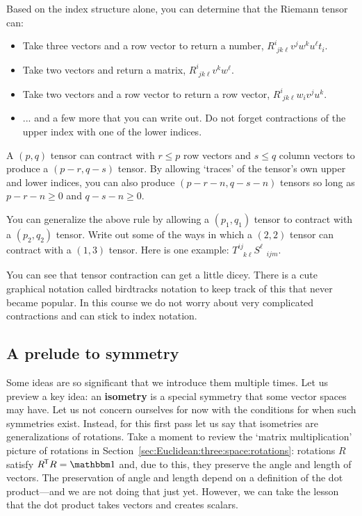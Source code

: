 Based on the index structure alone, you can determine that the Riemann tensor can:
\begin{itemize}
    \item Take three vectors and a row vector to return a number, $R^i_{\phantom{i}jk\ell} v^jw^ku^\ell t_i$.
    \item Take two vectors and return a matrix, $R^i_{\phantom{i}jk\ell}v^kw^\ell$. 
    \item Take two vectors and a row vector to return a row vector, $R^i_{\phantom{i}jk\ell}w_iv^ju^k$.
    \item ... and a few more that you can write out. Do not forget contractions of the upper index with one of the lower indices.
\end{itemize}
\begin{newrule}
A $(p,q)$ tensor can contract with $r\leq p$ row vectors and $s \leq q$ column vectors to produce a $(p-r, q-s)$ tensor. By allowing `traces' of the tensor's own upper and lower indices, you can also produce $(p-r-n, q-s-n)$ tensors so long as $p-r-n\geq 0$ and $q-s-n\geq 0$.
\end{newrule}
\begin{exercise}
You can generalize the above rule by allowing a $(p_1,q_1)$ tensor to contract with a $(p_2, q_2)$ tensor. Write out some of the ways in which a $(2,2)$ tensor can contract with a $(1,3)$ tensor. Here is one example: $T^{ij}_{\phantom{ij}k\ell} S^\ell_{\phantom{\ell}ijm}$. 
\end{exercise}
You can see that tensor contraction can get a little dicey. There is a cute graphical notation called birdtracks notation to keep track of this that never became popular. In this course we do not worry about very complicated contractions and can stick to index notation.


\subsection{A prelude to symmetry}
\label{sec:isometry:first:pass:indices}
Some ideas are so significant that we introduce them multiple times. Let us preview a key idea: an \textbf{isometry} is a special symmetry that some vector spaces may have. Let us not concern ourselves for now with the conditions for when such symmetries exist. Instead, for this first pass let us say that isometries are generalizations of rotations.  Take a moment to review the `matrix multiplication' picture of rotations in Section~\ref{sec:Euclidean:three:space:rotations}: rotations $R$ satisfy $R^\trans R = \one$ and, due to this, they preserve the angle and length of vectors. The preservation of angle and length depend on a definition of the dot product---and we are not doing that just yet. However, we can take the lesson that the dot product takes vectors and creates scalars.

